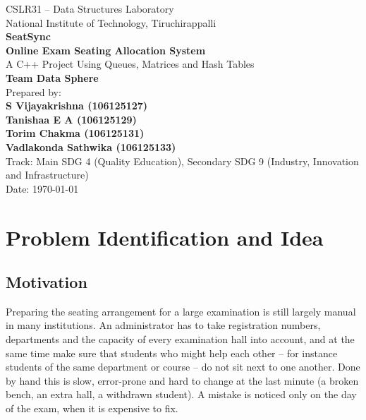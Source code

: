 \documentclass[12pt,a4paper]{report}
\begin{document}
\begin{titlepage}
\centering
{\large CSLR31 -- Data Structures Laboratory\\ National Institute of Technology, Tiruchirappalli}\\[1.5cm]
{\Huge \textbf{SeatSync}}\\[0.4cm]
{\Large \textbf{Online Exam Seating Allocation System}}\\[0.3cm]
{\large A C++ Project Using Queues, Matrices and Hash Tables}\\[1.5cm]
{\Large \textbf{Team Data Sphere}}\\[0.6cm]
{\Large Prepared by:}\\[0.3cm]
\textbf{S Vijayakrishna (106125127)}\\
\textbf{Tanishaa E A (106125129)}\\
\textbf{Torim Chakma (106125131)}\\
\textbf{Vadlakonda Sathwika (106125133)}\\[1.2cm]
{\large Track: Main SDG 4 (Quality Education), Secondary SDG 9 (Industry, Innovation and Infrastructure)}\\[1.2cm]
{\Large Date: \today}\\
\vfill
\end{titlepage}

\tableofcontents
\newpage

\chapter{Problem Identification and Idea}

\section{Motivation}
Preparing the seating arrangement for a large examination is still largely manual in many institutions.
An administrator has to take registration numbers, departments and the capacity of every examination hall
into account, and at the same time make sure that students who might help each other -- for instance
students of the same department or course -- do not sit next to one another. Done by hand this is slow,
error-prone and hard to change at the last minute (a broken bench, an extra hall, a withdrawn student).
A mistake is noticed only on the day of the exam, when it is expensive to fix.
\end{document}
